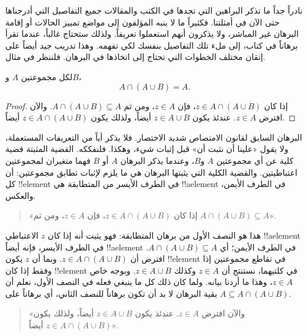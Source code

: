 \documentclass[../../../include/open-logic-section]{subfiles}
\begin{document}

نادراً جداً ما تذكر البراهين التي تجدها في الكتب والمقالات جميع
التفاصيل التي أدرجناها حتى الآن في أمثلتنا. فكثيراً ما لا ينبه المؤلفون
إلى مواضع تمييز الحالات أو إقامة البرهان غير المباشر، ولا يذكرون أنهم
استعملوا تعريفاً. ولذلك ستحتاج غالباً، عندما تقرأ برهاناً في كتاب، إلى
ملء تلك التفاصيل بنفسك لكي تفهمه. وهذا تدريب جيد أيضاً على إتقان مختلف
الخطوات التي تحتاج إلى اتخاذها في البرهان. فلننظر في مثال.

\begin{prop}[الامتصاص]
لكل مجموعتين $A$ و$B$،
\[
A \cap (A \cup B) = A.
\]
\end{prop}

\begin{proof}
إذا كان $z \in A \cap (A \cup B)$، فإن $z \in A$، ومن ثم
$A \cap (A \cup B) \subseteq A$. والآن افترض $z \in A$. عندئذ يكون
$z \in A \cup B$ أيضاً، ولذلك يكون $z \in A \cap (A \cup B)$ أيضاً.
\end{proof}

البرهان السابق لقانون الامتصاص شديد الاختصار. فلا يذكر أياً من التعريفات
المستعملة، ولا يقول «علينا أن نثبت أن» قبل إثبات شيء، وهكذا. فلنفككه.
القضية المثبتة قضية كلية عن أي مجموعتين $A$ و$B$، وعندما يذكر البرهان
$A$ أو $B$ فهما متغيران لمجموعتين اعتباطيتين. والقضية الكلية التي
يثبتها البرهان هي ما يلزم لإثبات تطابق مجموعتين: أن كل !!{element} في
الطرف الأيسر من المتطابقة هي !!a{element} في الطرف الأيمن، والعكس.

\begin{quote}
«إذا كان $z \in A \cap (A \cup B)$، فإن $z \in A$، ومن ثم
$A \cap (A \cup B) \subseteq A$».
\end{quote}

هذا هو النصف الأول من برهان المتطابقة: فهو يثبت أنه إذا كان $z$
الاعتباطي !!a{element} في الطرف الأيسر، فإنه أيضاً !!a{element} في
الطرف الأيمن؛ أي $A \cap (A \cup B) \subseteq A$. افترض أن
$z \in A \cap (A \cup B)$. وبما أن $z$ يكون !!{element} في تقاطع
مجموعتين إذا وفقط إذا كان !!{element} في كلتيهما، نستنتج أن
$z \in A$ وكذلك $z \in A \cup B$. وبوجه خاص $z \in A$، وهذا ما أردنا
بيانه. ولما كان ذلك كل ما ينبغي فعله في النصف الأول، نعلم أن بقية البرهان
لا بد أن تكون برهاناً للنصف الثاني، أي برهاناً على
$A \subseteq A \cap (A \cup B)$.

\begin{quote}
«والآن افترض $z \in A$. عندئذ يكون $z \in A \cup B$ أيضاً، ولذلك يكون
$z \in A \cap (A \cup B)$ أيضاً».
\end{quote}
\end{document}
